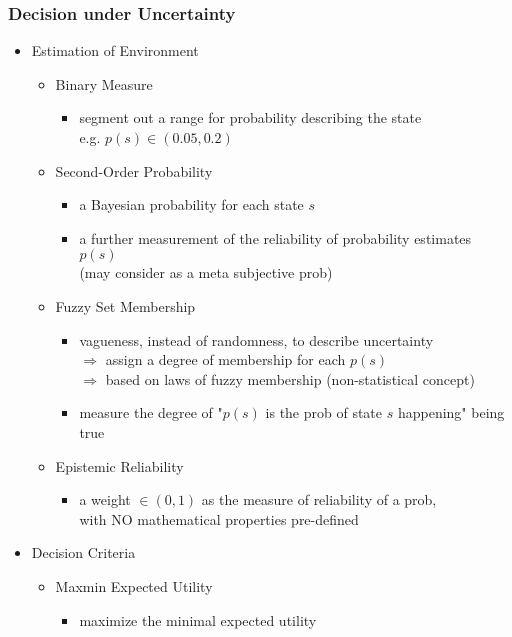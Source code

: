 \subsubsection{Decision under Uncertainty}
\begin{itemize}
\item Estimation of Environment
	\begin{itemize}
	\item Binary Measure
		\begin{itemize}
		\item segment out a range for probability describing the state \\
		e.g. $p(s)\in(0.05, 0.2)$
		\end{itemize}
	\item Second-Order Probability
		\begin{itemize}
		\item a Bayesian probability for each state $s$
		\item a further measurement of the reliability of probability estimates $p(s)$ \\
		(may consider as a meta subjective prob)
		\end{itemize}
	\item Fuzzy Set Membership
		\begin{itemize}
		\item vagueness, instead of randomness, to describe uncertainty \\
		$\Rightarrow$ assign a degree of membership for each $p(s)$ \\
		$\Rightarrow$ based on laws of fuzzy membership (non-statistical concept)
		\item measure the degree of "$p(s)$ is the prob of state $s$ happening" being true
		\end{itemize}
	\item Epistemic Reliability
		\begin{itemize}
		\item a weight $\in (0,1)$ as the measure of reliability of a prob, \\
		with NO mathematical properties pre-defined
		\end{itemize}
	\end{itemize}
\item Decision Criteria
	\begin{itemize}
	\item Maxmin Expected Utility
		\begin{itemize}
		\item maximize the minimal expected utility \\

\end{itemize}
\end{itemize}
\end{itemize}
